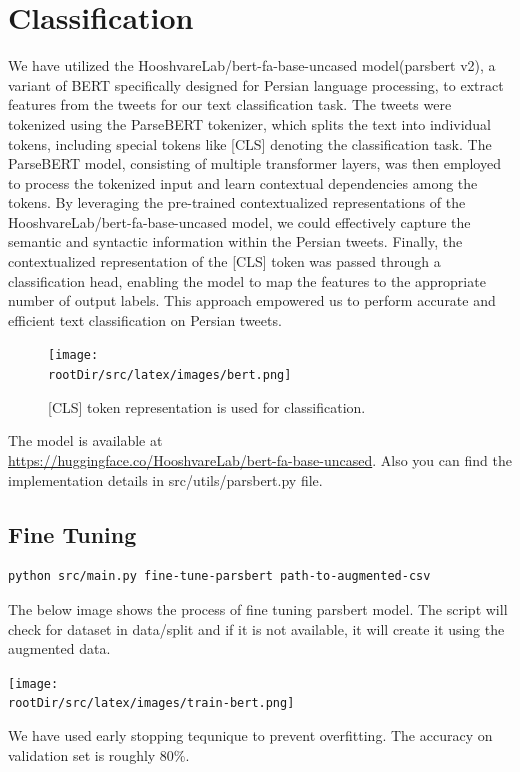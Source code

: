 \documentclass[12pt, letterpaper]{article}
\def\rootDir{../..}
\begin{document}
    \section{Classification}\label{sec:classification}
    We have utilized the HooshvareLab/bert-fa-base-uncased model(parsbert v2), a variant of BERT specifically designed for Persian language processing, to extract features from the tweets for our text classification task. 
    The tweets were tokenized using the ParseBERT tokenizer, which splits the text into individual tokens, including special tokens like [CLS] denoting the classification task. 
    The ParseBERT model, consisting of multiple transformer layers, was then employed to process the tokenized input and learn contextual dependencies among the tokens. By leveraging the pre-trained contextualized representations of the HooshvareLab/bert-fa-base-uncased model, we could effectively capture the semantic and syntactic information within the Persian tweets. Finally, the contextualized representation of the [CLS] token was passed through a classification head, enabling the model to map the features to the appropriate number of output labels. This approach empowered us to perform accurate and efficient text classification on Persian tweets.
    \begin{figure}[H]
        \begin{center}
            \texttt{[image: \\rootDir/src/latex/images/bert.png]}
        \end{center}
        \caption{[CLS] token representation is used for classification.}
    \end{figure}
    The model is available at \\\url{https://huggingface.co/HooshvareLab/bert-fa-base-uncased}. Also you can find the implementation details in src\slash utils\slash parsbert.py file.
    \subsection{Fine Tuning}\label{subsec:fine-tuning}
    \begin{lstlisting}[language=bash]
    python src/main.py fine-tune-parsbert path-to-augmented-csv
    \end{lstlisting}
    The below image shows the process of fine tuning parsbert model. The script will check for dataset in data\slash split and if it is not available, it will create it using the augmented data.
    \begin{center}
        \texttt{[image: \\rootDir/src/latex/images/train-bert.png]}
    \end{center}
    We have used early stopping tequnique to prevent overfitting. The accuracy on validation set is roughly 80\%. 
    
\end{document}
